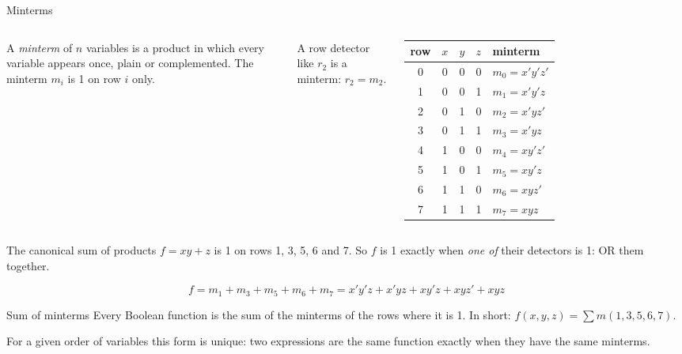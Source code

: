\documentclass[10pt]{wosm-slides}
\begin{document}
\begin{frame}{Minterms}
  \begin{columns}[T, totalwidth=\textwidth]
      \begin{definition}[Minterm]
        A \emph{minterm} of $n$ variables is a product in which every variable
        appears once, plain or complemented. The minterm $m_i$ is 1 on row $i$
        only.
      \end{definition}

      \smallskip
      A row detector like $r_2$ is a minterm: $r_2 = m_2$.
      \centering
      \small
      \begin{tabular}{@{}cccc|l@{}}
        row & $x$ & $y$ & $z$ & minterm \\
        \midrule
        0 & 0 & 0 & 0 & $m_0 = x'y'z'$ \\
        1 & 0 & 0 & 1 & $m_1 = x'y'z$ \\
        2 & 0 & 1 & 0 & $m_2 = x'yz'$ \\
        3 & 0 & 1 & 1 & $m_3 = x'yz$ \\
        4 & 1 & 0 & 0 & $m_4 = xy'z'$ \\
        5 & 1 & 0 & 1 & $m_5 = xy'z$ \\
        6 & 1 & 1 & 0 & $m_6 = xyz'$ \\
        7 & 1 & 1 & 1 & $m_7 = xyz$ \\
      \end{tabular}
  \end{columns}
\end{frame}

\begin{frame}{The canonical sum of products}
  $f = xy + z$ is 1 on rows 1, 3, 5, 6 and 7. So $f$ is 1 exactly when \emph{one of}
  their detectors is 1: OR them together.

  \[
    f = m_1 + m_3 + m_5 + m_6 + m_7
      = x'y'z + x'yz + xy'z + xyz' + xyz
  \]

  \begin{block}{Sum of minterms}
    Every Boolean function is the sum of the minterms of the rows where it is 1.
    In short: $f(x, y, z) = \sum m(1, 3, 5, 6, 7)$.
  \end{block}

  For a given order of variables this form is unique: two expressions are the same
  function exactly when they have the same minterms.
\end{frame}
\end{document}
